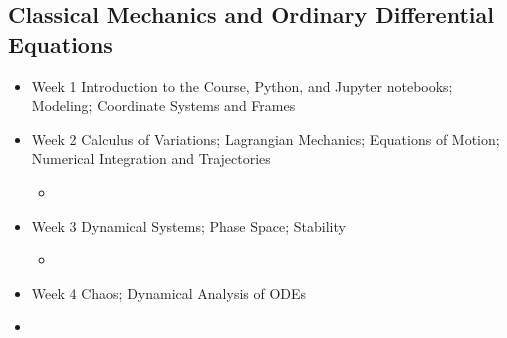 \documentclass[letterpaper,10pt,english]{jupyterBook}
\begin{document}
\subsection{Classical Mechanics and Ordinary Differential Equations}
\label{\detokenize{content/0_course/5_calendar:classical-mechanics-and-ordinary-differential-equations}}\begin{itemize}
\item {} 
\sphinxAtStartPar
Week 1 \sphinxhyphen{} Introduction to the Course, Python, and Jupyter notebooks; Modeling; Coordinate Systems and Frames

\item {} 
\sphinxAtStartPar
Week 2 \sphinxhyphen{} Calculus of Variations; Lagrangian Mechanics; Equations of Motion; Numerical Integration and Trajectories
\begin{itemize}
\item {} 
\sphinxAtStartPar
{}

\end{itemize}

\item {} 
\sphinxAtStartPar
Week 3 \sphinxhyphen{} Dynamical Systems; Phase Space; Stability
\begin{itemize}
\item {} 
\sphinxAtStartPar
{}

\end{itemize}

\item {} 
\sphinxAtStartPar
Week 4 \sphinxhyphen{} Chaos; Dynamical Analysis of ODEs

\item {} 
\sphinxAtStartPar
{}

\end{itemize}
\end{document}
